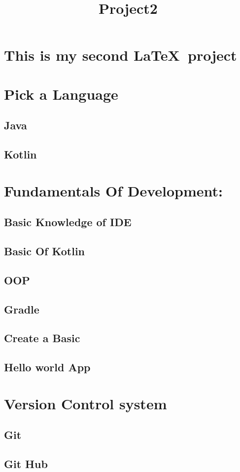 \documentclass{article}
\title{Project2}
\begin{document}
\section*{This is my second \LaTeX\ project}

\tableofcontents

\section{Pick a Language}
\subsection{Java}
\subsection{Kotlin}
\section{Fundamentals Of Development:}
\subsection{Basic Knowledge of IDE}
\subsection{Basic Of Kotlin}
\subsection{OOP}
\subsection{Gradle}
\subsection{Create a Basic}
\subsection{Hello world App}
\section{Version Control system}
\subsection{Git}
\subsection{Git Hub}
\end{document}
